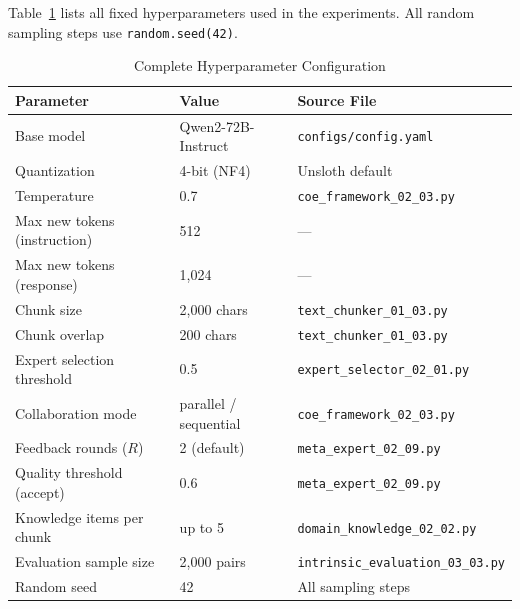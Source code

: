 Table~\ref{tab:hyperparameters} lists all fixed hyperparameters used in the experiments. All random sampling steps use \texttt{random.seed(42)}.

\begin{table}[h]
\centering
\caption{Complete Hyperparameter Configuration}
\label{tab:hyperparameters}
\small
\begin{tabular}{@{}p{4.5cm}p{3.5cm}p{4.5cm}@{}}
\toprule
\textbf{Parameter} & \textbf{Value} & \textbf{Source File} \\
\midrule
Base model & Qwen2-72B-Instruct & \texttt{configs/config.yaml} \\
Quantization & 4-bit (NF4) & Unsloth default \\
Temperature & 0.7 & \texttt{coe\_framework\_02\_03.py} \\
Max new tokens (instruction) & 512 & --- \\
Max new tokens (response) & 1,024 & --- \\
Chunk size & 2,000 chars & \texttt{text\_chunker\_01\_03.py} \\
Chunk overlap & 200 chars & \texttt{text\_chunker\_01\_03.py} \\
Expert selection threshold & 0.5 & \texttt{expert\_selector\_02\_01.py} \\
Collaboration mode & parallel / sequential & \texttt{coe\_framework\_02\_03.py} \\
Feedback rounds ($R$) & 2 (default) & \texttt{meta\_expert\_02\_09.py} \\
Quality threshold (accept) & 0.6 & \texttt{meta\_expert\_02\_09.py} \\
Knowledge items per chunk & up to 5 & \texttt{domain\_knowledge\_02\_02.py} \\
Evaluation sample size & 2,000 pairs & \texttt{intrinsic\_evaluation\_03\_03.py} \\
Random seed & 42 & All sampling steps \\
\bottomrule
\end{tabular}
\end{table}
